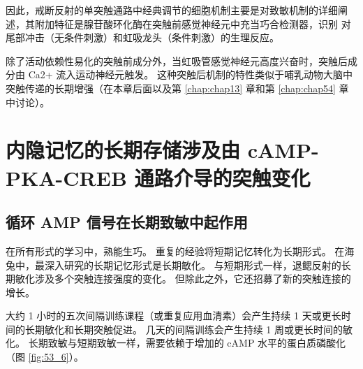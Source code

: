 因此，戒断反射的单突触通路中经典调节的细胞机制主要是对致敏机制的详细阐述，其附加特征是腺苷酸环化酶在突触前感觉神经元中充当巧合检测器，识别 对尾部冲击（无条件刺激）和虹吸龙头（条件刺激）的生理反应。

除了活动依赖性易化的突触前成分外，当虹吸管感觉神经元高度兴奋时，突触后成分由 Ca2+ 流入运动神经元触发。 这种突触后机制的特性类似于哺乳动物大脑中突触传递的长期增强（在本章后面以及第 \ref{chap:chap13} 章和第 \ref{chap:chap54} 章中讨论）。


\section{内隐记忆的长期存储涉及由 cAMP-PKA-CREB 通路介导的突触变化}
\subsection{循环 AMP 信号在长期致敏中起作用}
在所有形式的学习中，熟能生巧。 重复的经验将短期记忆转化为长期形式。 在海兔中，最深入研究的长期记忆形式是长期敏化。 与短期形式一样，退鳃反射的长期敏化涉及多个突触连接强度的变化。 但除此之外，它还招募了新的突触连接的增长。

大约 1 小时的五次间隔训练课程（或重复应用血清素）会产生持续 1 天或更长时间的长期敏化和长期突触促进。 几天的间隔训练会产生持续 1 周或更长时间的敏化。 长期致敏与短期致敏一样，需要依赖于增加的 cAMP 水平的蛋白质磷酸化（图 \ref{fig:53_6}）。

